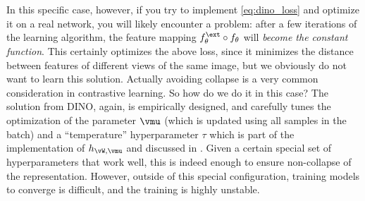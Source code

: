 \documentclass[../../book-main.tex]{subfiles}
\begin{document}
In this specific case, however, if you try to implement
\eqref{eq:dino_loss} and optimize it on a real network, you will
likely encounter a problem: after a few iterations of the learning
algorithm, the feature mapping
\(f_{\theta}^{\ext} \circ f_{\theta}\) will \textit{become the
constant function}.
This certainly optimizes the above loss, since it
minimizes the distance between features of different views of the
same image, but we obviously do not want to learn this solution.
Actually avoiding collapse is a very common consideration in
contrastive learning. So how do we do it in this case?
The solution
from DINO, again, is empirically designed, and carefully tunes the
optimization of the parameter \(\vmu\) (which is updated using all
samples in the batch) and a ``temperature'' hyperparameter \(\tau\)
which is part of the implementation of \(h_{\vW, \vmu}\) and
discussed in .
Given a
certain special set of hyperparameters that work well, this is indeed
enough to ensure non-collapse of the representation.
However, outside
of this special configuration, training models to converge is
difficult, and the training is highly unstable.
\end{document}
